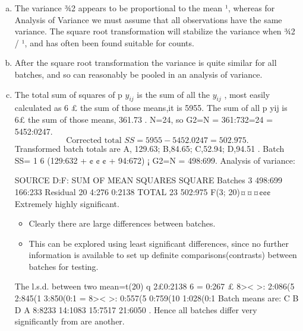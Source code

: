 \documentclass[a4paper,12pt]{article}
\begin{document}

\begin{enumerate}[(a)]
\item The variance ¾2 appears to be proportional to the mean ¹, whereas for Analysis of Variance
we must assume that all observations have the same variance. The square root transformation will
stabilize the variance when ¾2 / ¹, and has often been found suitable for counts.
\item After the square root transformation the variance is quite similar for all batches, and so can
reasonably be pooled in an analysis of variance.
\item The total sum of squares of p
$y_{ij}$ is the sum of all the $y_{ij}$ , most easily calculated as 6 £ the
sum of those means,it is 5955.
The sum of all p
yij is 6£ the sum of those means, 361.73 .
N=24, so G2=N = 361:732=24 = 5452:0247.
\[\mbox{Corrected total }SS=5955-5452.0247=502.975 .\]
Transformed batch totals are A, 129.63; B,84.65; C,52.94; D,94.51 .
Batch SS= 1
6 (129:632 + ¢ ¢ ¢ + 94:672) ¡ G2=N = 498:699.
Analysis of variance:

SOURCE D:F: SUM OF MEAN
SQUARES SQUARE
Batches 3 498:699 166:233
Residual 20 4:276 0:2138
TOTAL 23 502:975
F(3; 20)¤¤¤¢¢¢ Extremely highly significant.
\begin{itemize}
    \item Clearly there are large differences between batches. 
    \item This can be explored using least significant
differences, since no further information is available to set up definite comparisons(contrasts) between
batches for testing.
\end{itemize}

The l.s.d. between two mean=t(20)
q
2£0:2138
6 = 0:267 £
8><
>:
2:086(5%
2:845(1%
3:850(0:1%
=
8><
>:
0:557(5%
0:759(10%
1:028(0:1%
Batch means are: C B D A
8:8233 14:1083 15:7517 21:6050
.
Hence all batches differ very significantly from are another.
\end{enumerate}
\end{document}
